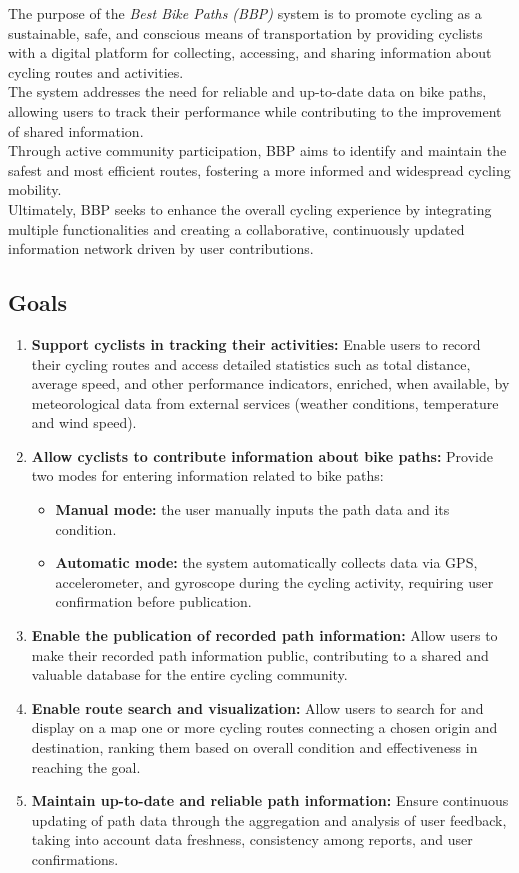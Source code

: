 The purpose of the \textit{Best Bike Paths (BBP)} system is to promote cycling as a sustainable, safe, and conscious means of transportation by providing cyclists with a digital platform for collecting, accessing, and sharing information about cycling routes and activities.\\
The system addresses the need for reliable and up-to-date data on bike paths, allowing users to track their performance while contributing to the improvement of shared information.\\
Through active community participation, BBP aims to identify and maintain the safest and most efficient routes, fostering a more informed and widespread cycling mobility.\\
Ultimately, BBP seeks to enhance the overall cycling experience by integrating multiple functionalities and creating a collaborative, continuously updated information network driven by user contributions.\\

\subsection{Goals}
\begin{enumerate}[label=G\arabic*.]
\item \textbf{Support cyclists in tracking their activities:} Enable users to record their cycling routes and access detailed statistics such as total distance, average speed, and other performance indicators, enriched, when available, by meteorological data from external services (weather conditions, temperature and wind speed).
\item \textbf{Allow cyclists to contribute information about bike paths:} Provide two modes for entering information related to bike paths:
\begin{itemize}
    \item \textbf{Manual mode:} the user manually inputs the path data and its condition.
    \item \textbf{Automatic mode:} the system automatically collects data via GPS, accelerometer, and gyroscope during the cycling activity, requiring user confirmation before publication.
\end{itemize}

\item \textbf{Enable the publication of recorded path information:} Allow users to make their recorded path information public, contributing to a shared and valuable database for the entire cycling community.
\item \textbf{Enable route search and visualization:} Allow users to search for and display on a map one or more cycling routes connecting a chosen origin and destination, ranking them based on overall condition and effectiveness in reaching the goal.
\item \textbf{Maintain up-to-date and reliable path information:} Ensure continuous updating of path data through the aggregation and analysis of user feedback, taking into account data freshness, consistency among reports, and user confirmations.
\end{enumerate}